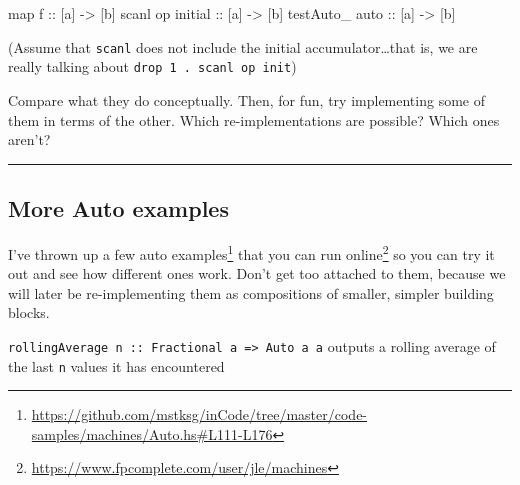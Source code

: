 \documentclass[]{article}
\newenvironment{Shaded}{}{}
\newcommand{\NormalTok}[1]{#1}
\newcommand{\OtherTok}[1]{\textcolor[rgb]{0.00,0.44,0.13}{#1}}
\renewcommand{\href}[2]{#2\footnote{\url{#1}}}
\begin{document}
\begin{Shaded}
\begin{Highlighting}[]
\NormalTok{map}\OtherTok{       f          ::}\NormalTok{ [a] }\OtherTok{->}\NormalTok{ [b]}
\NormalTok{scanl     op}\OtherTok{ initial ::}\NormalTok{ [a] }\OtherTok{->}\NormalTok{ [b]}
\NormalTok{testAuto_}\OtherTok{ auto       ::}\NormalTok{ [a] }\OtherTok{->}\NormalTok{ [b]}
\end{Highlighting}
\end{Shaded}

(Assume that \texttt{scanl} does not include the initial accumulator\ldots{}that
is, we are really talking about \texttt{drop\ 1\ .\ scanl\ op\ init})

Compare what they do conceptually. Then, for fun, try implementing some of them
in terms of the other. Which re-implementations are possible? Which ones aren't?

\begin{center}\rule{0.5\linewidth}{\linethickness}\end{center}

\hypertarget{more-auto-examples}{%
\subsection{More Auto examples}\label{more-auto-examples}}

\href{https://github.com/mstksg/inCode/tree/master/code-samples/machines/Auto.hs\#L111-L176}{I've
thrown up a few auto examples}
\href{https://www.fpcomplete.com/user/jle/machines}{that you can run online} so
you can try it out and see how different ones work. Don't get too attached to
them, because we will later be re-implementing them as compositions of smaller,
simpler building blocks.

\begin{description}
\tightlist
\item[\href{https://github.com/mstksg/inCode/tree/master/code-samples/machines/Auto.hs\#L111-L122}{rollingAverage}]
\texttt{rollingAverage\ n\ ::\ Fractional\ a\ =\textgreater{}\ Auto\ a\ a}
outputs a rolling average of the last \texttt{n} values it has encountered
\end{description}
\end{document}

